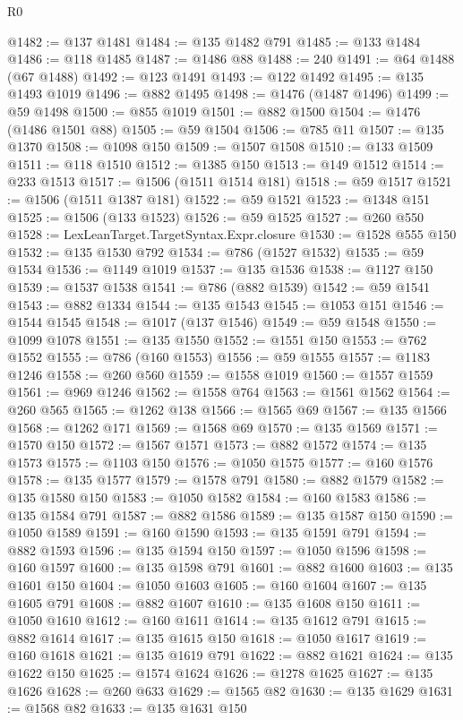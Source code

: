 \begin{lexlean}{R0}
\begin{coremodule}
@1482 := @137 @1481
@1484 := @135 @1482 @791
@1485 := @133 @1484
@1486 := @118 @1485
@1487 := @1486 @88
@1488 := 240
@1491 := @64 @1488 (@67 @1488)
@1492 := @123 @1491
@1493 := @122 @1492
@1495 := @135 @1493 @1019
@1496 := @882 @1495
@1498 := @1476 (@1487 @1496)
@1499 := @59 @1498
@1500 := @855 @1019
@1501 := @882 @1500
@1504 := @1476 (@1486 @1501 @88)
@1505 := @59 @1504
@1506 := @785 @11
@1507 := @135 @1370
@1508 := @1098 @150
@1509 := @1507 @1508
@1510 := @133 @1509
@1511 := @118 @1510
@1512 := @1385 @150
@1513 := @149 @1512
@1514 := @233 @1513
@1517 := @1506 (@1511 @1514 @181)
@1518 := @59 @1517
@1521 := @1506 (@1511 @1387 @181)
@1522 := @59 @1521
@1523 := @1348 @151
@1525 := @1506 (@133 @1523)
@1526 := @59 @1525
@1527 := @260 @550
@1528 := LexLeanTarget.TargetSyntax.Expr.closure
@1530 := @1528 @555 @150
@1532 := @135 @1530 @792
@1534 := @786 (@1527 @1532)
@1535 := @59 @1534
@1536 := @1149 @1019
@1537 := @135 @1536
@1538 := @1127 @150
@1539 := @1537 @1538
@1541 := @786 (@882 @1539)
@1542 := @59 @1541
@1543 := @882 @1334
@1544 := @135 @1543
@1545 := @1053 @151
@1546 := @1544 @1545
@1548 := @1017 (@137 @1546)
@1549 := @59 @1548
@1550 := @1099 @1078
@1551 := @135 @1550
@1552 := @1551 @150
@1553 := @762 @1552
@1555 := @786 (@160 @1553)
@1556 := @59 @1555
@1557 := @1183 @1246
@1558 := @260 @560
@1559 := @1558 @1019
@1560 := @1557 @1559
@1561 := @969 @1246
@1562 := @1558 @764
@1563 := @1561 @1562
@1564 := @260 @565
@1565 := @1262 @138
@1566 := @1565 @69
@1567 := @135 @1566
@1568 := @1262 @171
@1569 := @1568 @69
@1570 := @135 @1569
@1571 := @1570 @150
@1572 := @1567 @1571
@1573 := @882 @1572
@1574 := @135 @1573
@1575 := @1103 @150
@1576 := @1050 @1575
@1577 := @160 @1576
@1578 := @135 @1577
@1579 := @1578 @791
@1580 := @882 @1579
@1582 := @135 @1580 @150
@1583 := @1050 @1582
@1584 := @160 @1583
@1586 := @135 @1584 @791
@1587 := @882 @1586
@1589 := @135 @1587 @150
@1590 := @1050 @1589
@1591 := @160 @1590
@1593 := @135 @1591 @791
@1594 := @882 @1593
@1596 := @135 @1594 @150
@1597 := @1050 @1596
@1598 := @160 @1597
@1600 := @135 @1598 @791
@1601 := @882 @1600
@1603 := @135 @1601 @150
@1604 := @1050 @1603
@1605 := @160 @1604
@1607 := @135 @1605 @791
@1608 := @882 @1607
@1610 := @135 @1608 @150
@1611 := @1050 @1610
@1612 := @160 @1611
@1614 := @135 @1612 @791
@1615 := @882 @1614
@1617 := @135 @1615 @150
@1618 := @1050 @1617
@1619 := @160 @1618
@1621 := @135 @1619 @791
@1622 := @882 @1621
@1624 := @135 @1622 @150
@1625 := @1574 @1624
@1626 := @1278 @1625
@1627 := @135 @1626
@1628 := @260 @633
@1629 := @1565 @82
@1630 := @135 @1629
@1631 := @1568 @82
@1633 := @135 @1631 @150

\end{coremodule}
\end{lexlean}
